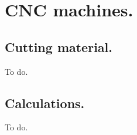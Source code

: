 \chapter{CNC machines.}\label{CncMachines}

\section{Cutting material.}
To do.

\section{Calculations.}
To do.

